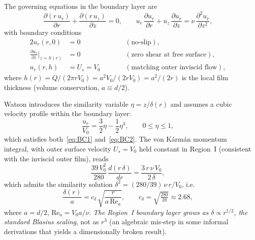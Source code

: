 \documentclass[10pt,letterpaper]{article}
\newcommand{\Rey}{\mathrm{Re}}
\begin{document}
The governing equations in the boundary layer are
\begin{equation}
    \frac{\partial(r\,u_r)}{\partial r} + \frac{\partial(r\,u_z)}{\partial z}
    = 0,
    \qquad
    u_r\,\frac{\partial u_r}{\partial r} + u_z\,\frac{\partial u_r}{\partial z}
    = \nu\,\frac{\partial^2 u_r}{\partial z^2},
    \label{eq:BLeqs}
\end{equation}
with boundary conditions
\begin{alignat}{2}
    u_r(r,0) &= 0 &&\qquad (\text{no-slip}),\label{eq:BC1}\\
    \frac{\partial u_r}{\partial z}\bigg|_{z=h(r)} &= 0 &&\qquad
    (\text{zero shear at free surface}),\label{eq:BC2}\\
    u_r(r,h) &= U_s = V_0 &&\qquad (\text{matching outer inviscid flow}),
    \label{eq:BC3}
\end{alignat}
where $h(r) = Q/(2\pi r V_0) = a^2 V_0/(2r V_0) = a^2/(2r)$
is the local film thickness (volume conservation, $a \equiv d/2$).

Watson introduces the similarity variable $\eta = z/\delta(r)$ and assumes
a cubic velocity profile within the boundary layer:
\begin{equation}
    \frac{u_r}{V_0} = \frac{3}{2}\eta - \frac{1}{2}\eta^3,
    \qquad 0 \leq \eta \leq 1,
    \label{eq:cubicprofile}
\end{equation}
which satisfies both~\eqref{eq:BC1} and~\eqref{eq:BC2}. The von K\'{a}rm\'{a}n
momentum integral, with outer surface velocity $U_s = V_0$ held constant
in Region~I (consistent with the inviscid outer film), reads
\begin{equation}
    \frac{39\,V_0^2}{280}\,\frac{d(r\,\delta)}{dr}
    = \frac{3\,r\,\nu\,V_0}{2\,\delta},
    \label{eq:karman}
\end{equation}
which admits the similarity solution $\delta^2 = (280/39)\,\nu\,r/V_0$, i.e.
\begin{equation}
    \frac{\delta(r)}{a} = c_\delta\,\sqrt{\frac{r}{a\,\Rey_a}},
    \qquad c_\delta = \sqrt{\tfrac{280}{39}} \approx 2.68,
    \label{eq:deltawatson}
\end{equation}
where $a = d/2$, $\Rey_a = V_0 a/\nu$. \emph{The Region~I boundary layer
grows as $\delta \propto r^{1/2}$, the standard Blasius scaling}, not as
$r^3$ (an algebraic mis-step in some informal derivations that yields a
dimensionally broken result).
\end{document}
